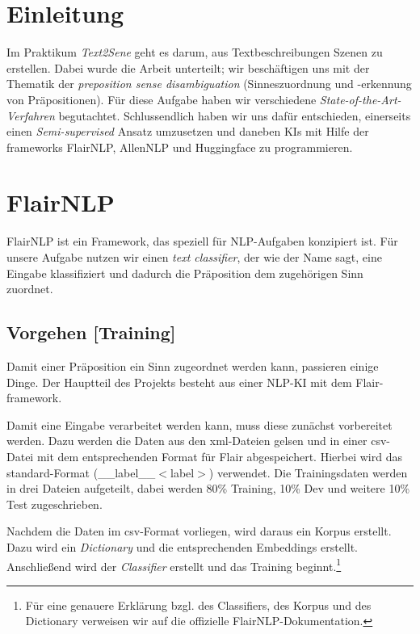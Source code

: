 \documentclass[10pt,a4paper]{article}
\begin{document}
\tableofcontents
\newpage

\section{Einleitung}
\begin{flushleft}
Im Praktikum \textit{Text2Sene} geht es darum, aus Textbeschreibungen Szenen zu erstellen. Dabei wurde die Arbeit unterteilt; wir beschäftigen uns mit der Thematik der \textit{preposition sense disambiguation} (Sinneszuordnung und -erkennung von Präpositionen). Für diese Aufgabe haben wir verschiedene \textit{State-of-the-Art-Verfahren} begutachtet. Schlussendlich haben wir uns dafür entschieden, einerseits einen \textit{Semi-supervised} Ansatz umzusetzen und daneben KIs mit Hilfe der frameworks FlairNLP, AllenNLP und Huggingface zu programmieren.
\end{flushleft}

\section{FlairNLP}
\begin{flushleft}
FlairNLP ist ein Framework, das speziell für NLP-Aufgaben konzipiert ist. Für unsere Aufgabe nutzen wir einen \textit{text classifier}, der wie der Name sagt, eine Eingabe klassifiziert und dadurch die Präposition dem zugehörigen Sinn zuordnet.
\end{flushleft}

\subsection{Vorgehen [Training]}
\begin{flushleft}
Damit einer Präposition ein Sinn zugeordnet werden kann, passieren einige Dinge. Der Hauptteil des Projekts besteht aus einer NLP-KI mit dem Flair-framework.

Damit eine Eingabe verarbeitet werden kann, muss diese zunächst vorbereitet werden. Dazu werden die Daten aus den xml-Dateien gelsen und in einer csv-Datei mit dem entsprechenden Format für Flair abgespeichert. Hierbei wird das standard-Format (\_\_label\_\_$<$label$>$) verwendet. Die Trainingsdaten werden in drei Dateien aufgeteilt, dabei werden 80\% Training, 10\% Dev und weitere 10\% Test zugeschrieben.

Nachdem die Daten im csv-Format vorliegen, wird daraus ein Korpus erstellt. Dazu wird ein \textit{Dictionary} und die entsprechenden Embeddings erstellt. Anschließend wird der \textit{Classifier} erstellt und das Training beginnt.\footnote{Für eine genauere Erklärung bzgl. des Classifiers, des Korpus und des Dictionary verweisen wir auf die offizielle FlairNLP-Dokumentation.}
\end{flushleft}
\end{document}
